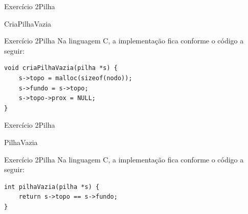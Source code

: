\documentclass[aspectratio=169]{beamer}
\begin{document}

\begin{frame}[fragile]{Exercício 2}{Pilha}
\begin{algorithm}[H]
\caption{CriaPilhaVazia} 
\label{CriaPilhaVazia}
\end{algorithm}
\end{frame}


\begin{frame}[fragile]{Exercício 2}{Pilha}
Na linguagem C, a implementação fica conforme o código a seguir:
\begin{lstlisting}[style=CStyle]
void criaPilhaVazia(pilha *s) {
    s->topo = malloc(sizeof(nodo));
    s->fundo = s->topo;
    s->topo->prox = NULL;
}
\end{lstlisting}  
\end{frame}


\begin{frame}[fragile]{Exercício 2}{Pilha}
\begin{algorithm}[H]
\caption{PilhaVazia} 
\label{PilhaVazia}
\end{algorithm}
\end{frame}


\begin{frame}[fragile]{Exercício 2}{Pilha}
Na linguagem C, a implementação fica conforme o código a seguir:
\begin{lstlisting}[style=CStyle]
int pilhaVazia(pilha *s) {
    return s->topo == s->fundo;
}
\end{lstlisting}  
\end{frame}
\end{document}
